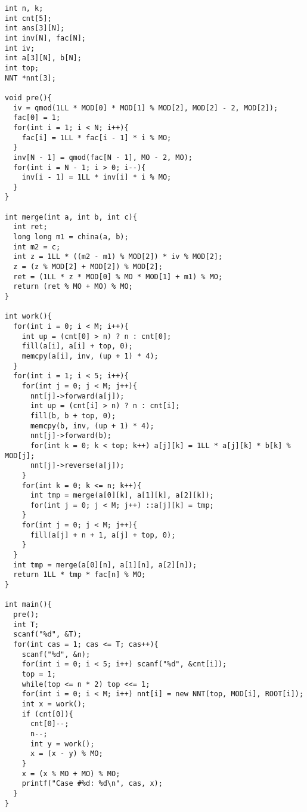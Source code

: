 \begin{verbatim}
int n, k;
int cnt[5];
int ans[3][N];
int inv[N], fac[N];
int iv;
int a[3][N], b[N];
int top;
NNT *nnt[3];

void pre(){
  iv = qmod(1LL * MOD[0] * MOD[1] % MOD[2], MOD[2] - 2, MOD[2]);
  fac[0] = 1;
  for(int i = 1; i < N; i++){
    fac[i] = 1LL * fac[i - 1] * i % MO;
  }
  inv[N - 1] = qmod(fac[N - 1], MO - 2, MO);
  for(int i = N - 1; i > 0; i--){
    inv[i - 1] = 1LL * inv[i] * i % MO;
  }
}

int merge(int a, int b, int c){
  int ret;
  long long m1 = china(a, b);
  int m2 = c;
  int z = 1LL * ((m2 - m1) % MOD[2]) * iv % MOD[2];
  z = (z % MOD[2] + MOD[2]) % MOD[2];
  ret = (1LL * z * MOD[0] % MO * MOD[1] + m1) % MO;
  return (ret % MO + MO) % MO;
}

int work(){
  for(int i = 0; i < M; i++){
    int up = (cnt[0] > n) ? n : cnt[0];
    fill(a[i], a[i] + top, 0);
    memcpy(a[i], inv, (up + 1) * 4);
  }
  for(int i = 1; i < 5; i++){
    for(int j = 0; j < M; j++){
      nnt[j]->forward(a[j]);
      int up = (cnt[i] > n) ? n : cnt[i];
      fill(b, b + top, 0);
      memcpy(b, inv, (up + 1) * 4);
      nnt[j]->forward(b);
      for(int k = 0; k < top; k++) a[j][k] = 1LL * a[j][k] * b[k] % MOD[j];
      nnt[j]->reverse(a[j]);
    }
    for(int k = 0; k <= n; k++){
      int tmp = merge(a[0][k], a[1][k], a[2][k]);
      for(int j = 0; j < M; j++) ::a[j][k] = tmp;
    }
    for(int j = 0; j < M; j++){
      fill(a[j] + n + 1, a[j] + top, 0);
    }
  }
  int tmp = merge(a[0][n], a[1][n], a[2][n]);
  return 1LL * tmp * fac[n] % MO;
}

int main(){
  pre();
  int T;
  scanf("%d", &T);
  for(int cas = 1; cas <= T; cas++){
    scanf("%d", &n);
    for(int i = 0; i < 5; i++) scanf("%d", &cnt[i]);
    top = 1;
    while(top <= n * 2) top <<= 1;
    for(int i = 0; i < M; i++) nnt[i] = new NNT(top, MOD[i], ROOT[i]);
    int x = work();
    if (cnt[0]){
      cnt[0]--;
      n--;
      int y = work();
      x = (x - y) % MO;
    }
    x = (x % MO + MO) % MO;
    printf("Case #%d: %d\n", cas, x);
  }
}
\end{verbatim}
